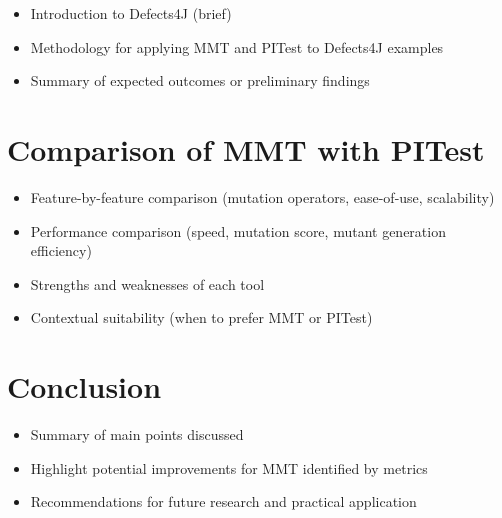 \documentclass[12pt,a4paper]{article}
\begin{document}
\begin{itemize}
	\item Introduction to Defects4J (brief)
	\item Methodology for applying MMT and PITest to Defects4J examples
	\item Summary of expected outcomes or preliminary findings
\end{itemize}

\section{Comparison of MMT with PITest}
\begin{itemize}
	\item Feature-by-feature comparison (mutation operators, ease-of-use,
	      scalability)
	\item Performance comparison (speed, mutation score, mutant generation
	      efficiency)
	\item Strengths and weaknesses of each tool
	\item Contextual suitability (when to prefer MMT or PITest)
\end{itemize}

\section{Conclusion}
\begin{itemize}
	\item Summary of main points discussed
	\item Highlight potential improvements for MMT identified by metrics
	\item Recommendations for future research and practical application
\end{itemize}

\printbibliography
\end{document}
